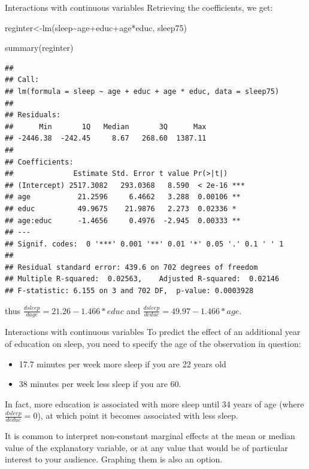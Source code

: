 \documentclass[
  ignorenonframetext,
]{beamer}
\newenvironment{Shaded}{\begin{snugshade}}{\end{snugshade}}
\newcommand{\FunctionTok}[1]{\textcolor[rgb]{0.00,0.00,0.00}{#1}}
\newcommand{\NormalTok}[1]{#1}
\newcommand{\OtherTok}[1]{\textcolor[rgb]{0.56,0.35,0.01}{#1}}
\newcommand{\SpecialCharTok}[1]{\textcolor[rgb]{0.00,0.00,0.00}{#1}}
\begin{document}
\begin{frame}[fragile]{Interactions with continuous variables}
\protect\hypertarget{interactions-with-continuous-variables-3}{}
Retrieving the coefficients, we get:

\tiny

\begin{Shaded}
\begin{Highlighting}[]
\NormalTok{reginter}\OtherTok{\textless{}{-}}\FunctionTok{lm}\NormalTok{(sleep}\SpecialCharTok{\textasciitilde{}}\NormalTok{age}\SpecialCharTok{+}\NormalTok{educ}\SpecialCharTok{+}\NormalTok{age}\SpecialCharTok{*}\NormalTok{educ, sleep75)}

\FunctionTok{summary}\NormalTok{(reginter)}
\end{Highlighting}
\end{Shaded}

\begin{verbatim}
## 
## Call:
## lm(formula = sleep ~ age + educ + age * educ, data = sleep75)
## 
## Residuals:
##      Min       1Q   Median       3Q      Max 
## -2446.38  -242.45     8.67   268.60  1387.11 
## 
## Coefficients:
##              Estimate Std. Error t value Pr(>|t|)    
## (Intercept) 2517.3082   293.0368   8.590  < 2e-16 ***
## age           21.2596     6.4662   3.288  0.00106 ** 
## educ          49.9675    21.9876   2.273  0.02336 *  
## age:educ      -1.4656     0.4976  -2.945  0.00333 ** 
## ---
## Signif. codes:  0 '***' 0.001 '**' 0.01 '*' 0.05 '.' 0.1 ' ' 1
## 
## Residual standard error: 439.6 on 702 degrees of freedom
## Multiple R-squared:  0.02563,    Adjusted R-squared:  0.02146 
## F-statistic: 6.155 on 3 and 702 DF,  p-value: 0.0003928
\end{verbatim}

\normalsize

thus \(\frac{dsleep}{dage}=21.26-1.466*educ\) and
\(\frac{dsleep}{deduc}=49.97-1.466*age.\)
\end{frame}

\begin{frame}{Interactions with continuous variables}
\protect\hypertarget{interactions-with-continuous-variables-4}{}
To predict the effect of an additional year of education on sleep, you
need to specify the age of the observation in question:

\begin{itemize}
\item
  17.7 minutes per week more sleep if you are 22 years old
\item
  38 minutes per week less sleep if you are 60.
\end{itemize}

In fact, more education is associated with more sleep until 34 years of
age (where \(\frac{dsleep}{deduc}=0\)), at which point it becomes
associated with less sleep.

It is common to interpret non-constant marginal effects at the mean or
median value of the explanatory variable, or at any value that would be
of particular interest to your audience. Graphing them is also an
option.
\end{frame}
\end{document}
